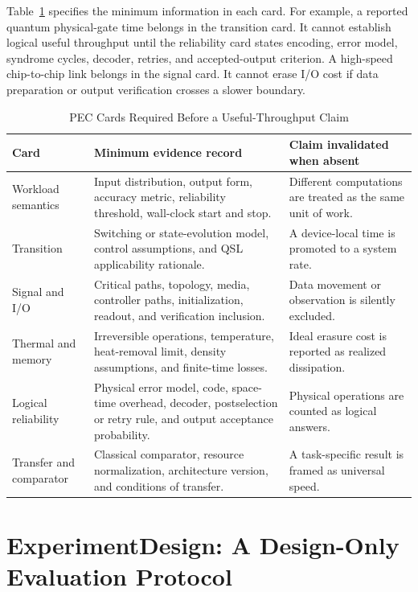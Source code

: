 \documentclass[conference]{IEEEtran}
\begin{document}
Table~\ref{tab:cards} specifies the minimum information in each card. For
example, a reported quantum physical-gate time belongs in the transition card.
It cannot establish logical useful throughput until the reliability card
states encoding, error model, syndrome cycles, decoder, retries, and
accepted-output criterion. A high-speed chip-to-chip link belongs in the
signal card. It cannot erase I/O cost if data preparation or output
verification crosses a slower boundary.

\begin{table}[t]
\caption{PEC Cards Required Before a Useful-Throughput Claim}
\label{tab:cards}
\centering
\footnotesize
\begin{tabular}{p{}p{}p{}}
\toprule
Card & Minimum evidence record & Claim invalidated when absent\\
\midrule
Workload semantics & Input distribution, output form, accuracy metric, reliability threshold, wall-clock start and stop. & Different computations are treated as the same unit of work.\\
Transition & Switching or state-evolution model, control assumptions, and QSL applicability rationale. & A device-local time is promoted to a system rate.\\
Signal and I/O & Critical paths, topology, media, controller paths, initialization, readout, and verification inclusion. & Data movement or observation is silently excluded.\\
Thermal and memory & Irreversible operations, temperature, heat-removal limit, density assumptions, and finite-time losses. & Ideal erasure cost is reported as realized dissipation.\\
Logical reliability & Physical error model, code, space-time overhead, decoder, postselection or retry rule, and output acceptance probability. & Physical operations are counted as logical answers.\\
Transfer and comparator & Classical comparator, resource normalization, architecture version, and conditions of transfer. & A task-specific result is framed as universal speed.\\
\bottomrule
\end{tabular}
\end{table}

\section{ExperimentDesign: A Design-Only Evaluation Protocol}
\end{document}
